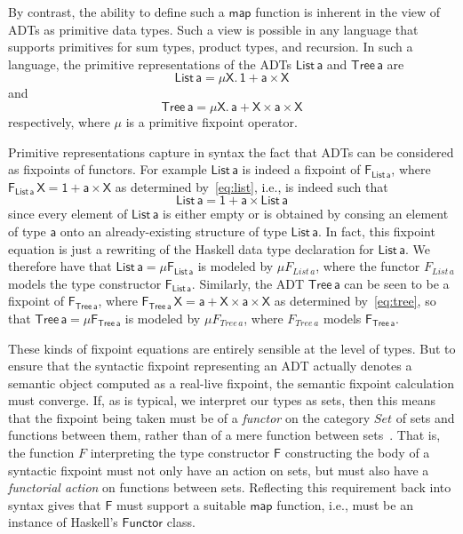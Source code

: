 \documentclass[acmsmall,screen,review,anonymous]{acmart}
\theoremstyle{definition}
\begin{document}
By contrast, the ability to define such a $\mathsf{map}$ function is
inherent in the view of ADTs as primitive data types. Such a view is
possible in any language that supports primitives for sum types,
product types, and recursion. In such a language, the primitive
representations of the ADTs $\mathsf{List\,a}$ and $\mathsf{Tree\,a}$
are
\begin{equation}\label{eq:list}
  \mathsf{List\,a} = \mathsf{\mu X.\, 1 + a \times X}
\end{equation}
and 
\begin{equation}\label{eq:tree}
  \mathsf{Tree\,a} = \mathsf{\mu X.\, a + X \times a \times X}
\end{equation}
respectively, where $\mathsf{\mu}$ is a primitive fixpoint operator.

Primitive representations capture in syntax the fact that ADTs can be
considered as fixpoints of functors. For example $\mathsf{List\,a}$ is
indeed a fixpoint of $\mathsf{F_{List\,a}}$, where
$\mathsf{F_{List\,a}\,X} = \mathsf{1 + a \times X}$ as determined
by~\eqref{eq:list}, i.e., is indeed such that
\[\mathsf{List\,a} = \mathsf{1 + a \times List\,a}\] 
since every element of $\mathsf{List\,a}$ is either empty or is
obtained by consing an element of type $\mathsf{a}$ onto an
already-existing structure of type $\mathsf{List\,a}$. In fact, this
fixpoint equation is just a rewriting of the Haskell data type
declaration for $\mathsf{List\,a}$. We therefore have that
$\mathsf{List\, a} = \mathsf{\mu F_{List\,a}}$ is modeled by $\mu
F_{\mathit{List}\,a}$, where the functor $F_{\mathit{List}\,a}$ models
the type constructor $\mathsf{F_{List\,a}}$. Similarly, the ADT
$\mathsf{Tree\,a}$ can be seen to be a fixpoint of
$\mathsf{F_{Tree\,a}}$, where $\mathsf{F_{Tree\,a}\,X} = \mathsf{a + X
  \times a \times X}$ as determined by~\eqref{eq:tree}, so that
$\mathsf{Tree\, a} = \mathsf{ \mu F_{Tree\,a}}$ is modeled by $\mu
F_{\mathit{Tree}\,a}$, where $F_{\mathit{Tree}\,a} $ models
$\mathsf{F_{Tree\,a}}$.
 
These kinds of fixpoint equations are entirely sensible at the level
of types. But to ensure that the syntactic fixpoint representing an
ADT actually denotes a semantic object computed as a real-live
fixpoint, the semantic fixpoint calculation must converge.  If, as is
typical, we interpret our types as sets, then this means that the
fixpoint being taken must be of a {\em functor} on the category
$\mathit{Set}$ of sets and functions between them, rather than of a
mere function between sets~\cite{tfca}.  That is, the function $F$
interpreting the type constructor $\mathsf{F}$ constructing the body
of a syntactic fixpoint must not only have an action on sets, but must
also have a {\em functorial action} on functions between
sets. Reflecting this requirement back into syntax gives that
$\mathsf{F}$ must support a suitable
$\mathsf{map}$ function, i.e., must be an instance of Haskell's
$\mathsf{Functor}$ class.
\end{document}
